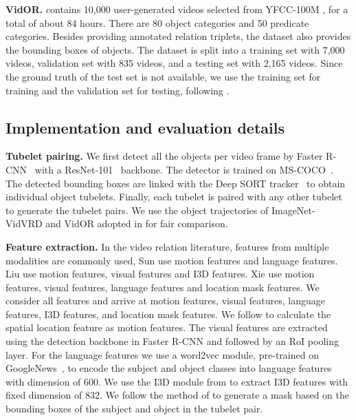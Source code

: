 \documentclass[10pt,twocolumn,letterpaper]{article}
\begin{document}
\textbf{VidOR.} \cite{shang2019annotating} contains 10,000 user-generated videos selected from YFCC-100M \cite{thomee2016yfcc100m}, for a total of about 84 hours. There are 80 object categories and 50 predicate categories. Besides providing annotated relation triplets, the dataset also provides the bounding boxes of objects. The dataset is split into a training set with 7,000 videos, validation set with 835 videos, and a testing set with 2,165 videos. Since the ground truth of the test set is not available, we use the training set for training and the validation set for testing, following \cite{liu2020beyond,qian2019video, xie2020video, su2020video}.

\subsection{Implementation and evaluation details}
\label{sec:implementation}



\textbf{Tubelet pairing.} We first detect all the objects per video frame by Faster R-CNN~\cite{2015NIPS-faster} with a ResNet-101~\cite{2016CVPR-ResNet} backbone. The detector is trained on MS-COCO~\cite{lin2014microsoft}. The detected bounding boxes are linked with the Deep SORT tracker~\cite{2017ICIP-DeepSort} to obtain individual object tubelets. 
Finally, each tubelet is paired with any other tubelet to generate the tubelet pairs. We use the object trajectories of ImageNet-VidVRD and VidOR adopted in \cite{shang2017video, qian2019video, su2020video, sun2019video} for fair comparison. 

\textbf{Feature extraction.}
In the video relation literature, features from multiple modalities are commonly used, \eg
Sun \etal \cite{sun2019video} use motion features and language features. Liu \etal \cite{liu2020beyond} use motion features, visual features and I3D features. Xie \etal \cite{xie2020video} use motion features, visual features, language features and location mask features. 
We consider all features and arrive at motion features, visual features, language features, I3D features, and location mask features. 
We follow \cite{sun2019video} to calculate the spatial location feature as motion features. The visual features are extracted using the detection backbone in Faster R-CNN and followed by an RoI pooling layer. For the language features we use a word2vec module, pre-trained on GoogleNews~\cite{mikolov2013efficient}, to encode the subject and object classes into language features with dimension of 600. We use the I3D module from \cite{carreira2017quo} to extract I3D features with fixed dimension of 832. We follow the method of \cite{xie2020video} to generate a mask based on the bounding boxes of the subject and object in the tubelet pair.
\end{document}
